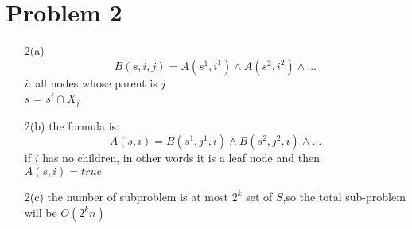 \documentclass[12pt,letterpaper]{article}
\begin{document}
\section{Problem 2}
    \begin{itemize}
        \item [2(a)]
            \[B(s,i,j)=A(s^1,i^1)\wedge A(s^2,i^2)\wedge \dots\]
            $i$: all nodes whose parent is $j$\\
            $s $ = $s^i \cap X_j$ 
        \item  [2(b)]
            the formula is:
            \[A(s,i)=B(s^1,j^1,i)\wedge  B(s^2,j^2,i)\wedge \dots \]
            if $i$ has no children, in other words it is a leaf node and then \\
            $A(s,i)=true$
        \item [2(c)]
            the number of subproblem is at most $2^k$ set of $S$,so the total sub-problem will be $O(2^kn)$
    \end{itemize}
\end{document}
